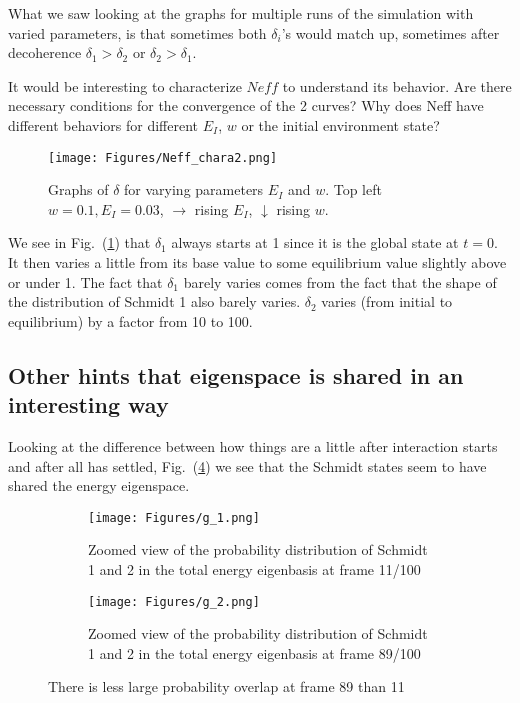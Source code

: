 \documentclass{article}
\begin{document}
What we saw looking at the graphs for multiple runs of the simulation with varied parameters, is that sometimes both $\delta_i$'s would match up, sometimes after decoherence $\delta_1>\delta_2$ or $\delta_2>\delta_1$.

It would be interesting to characterize $Neff$ to understand its behavior. Are there necessary conditions for the convergence of the 2 curves? Why does Neff have different behaviors for different $E_I$, $w$ or the initial environment state? 

\begin{figure}[h]
    \centering
    \texttt{[image: Figures/Neff\_chara2.png]}
    \caption{Graphs of $\delta$ for varying parameters $E_I$ and $w$. Top left $w=0.1, E_I=0.03$, $\rightarrow$ rising $E_I$, $\downarrow$ rising $w$.}
    \label{fig:characteriazation_Neff}
\end{figure}


We see in Fig.~(\ref{fig:characteriazation_Neff}) that $\delta_1$ always starts at 1 since it is the global state at $t=0$. It then varies a little from its base value to some equilibrium value slightly above or under 1. The fact that $\delta_1$ barely varies comes from the fact that the shape of the distribution of Schmidt 1 also barely varies. $\delta_2$ varies (from initial to equilibrium) by a factor from 10 to 100.

\subsection{Other hints that eigenspace is shared in an interesting way}

Looking at the difference between how things are a little after interaction starts and after all has settled, Fig.~(\ref{fig:gif_compare}) we see that the Schmidt states seem to have shared the energy eigenspace.

\begin{figure}[h!]
  \centering
  \begin{subfigure}[b]{0.4\linewidth}
    \texttt{[image: Figures/g\_1.png]}
    \caption{Zoomed view of the probability distribution of Schmidt 1 and 2 in the total energy eigenbasis at frame 11/100}
    \label{fig:1}
  \end{subfigure}
  \begin{subfigure}[b]{0.4\linewidth}
    \texttt{[image: Figures/g\_2.png]}
    \caption{Zoomed view of the probability distribution of Schmidt 1 and 2 in the total energy eigenbasis at frame 89/100}
    \label{fig:2}
  \end{subfigure}
  \caption{There is less large probability overlap at frame 89 than 11}
  \label{fig:gif_compare}
\end{figure}
\end{document}
